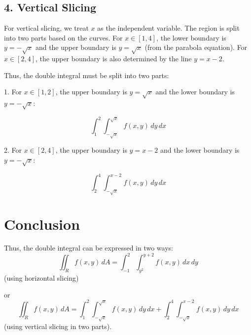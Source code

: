 \documentclass[11pt]{article}
\begin{document}
\newpage

\subsection{4. Vertical Slicing}

For vertical slicing, we treat \( x \) as the independent variable. The region is split into two parts based on the curves. For \( x \in [1, 4] \), the lower boundary is \( y = -\sqrt{x} \) and the upper boundary is \( y = \sqrt{x} \) (from the parabola equation). For \( x \in [2, 4] \), the upper boundary is also determined by the line \( y = x - 2 \).

Thus, the double integral must be split into two parts:

1. For \( x \in [1, 2] \), the upper boundary is \( y = \sqrt{x} \) and the lower boundary is \( y = -\sqrt{x} \):

\[
\int_1^2 \int_{-\sqrt{x}}^{\sqrt{x}} f(x, y) \, dy \, dx
\]

2. For \( x \in [2, 4] \), the upper boundary is \( y = x - 2 \) and the lower boundary is \( y = -\sqrt{x} \):

\[
\int_2^4 \int_{-\sqrt{x}}^{x-2} f(x, y) \, dy \, dx
\]

\newpage

\section{Conclusion}

Thus, the double integral can be expressed in two ways:
\[
\iint_R f(x, y) \, dA = \int_{-1}^2 \int_{y^2}^{y+2} f(x, y) \, dx \, dy
\]
(using horizontal slicing)

or
\[
\iint_R f(x, y) \, dA = \int_1^2 \int_{-\sqrt{x}}^{\sqrt{x}} f(x, y) \, dy \, dx + \int_2^4 \int_{-\sqrt{x}}^{x-2} f(x, y) \, dy \, dx
\]
(using vertical slicing in two parts).
\end{document}

